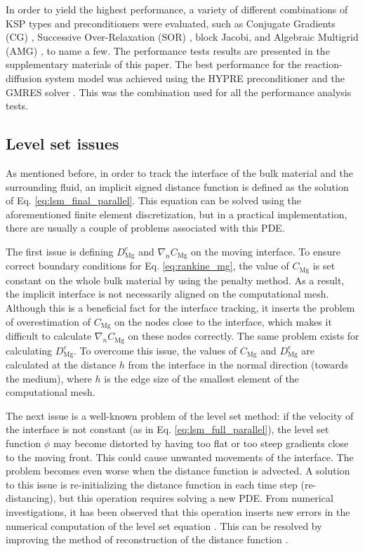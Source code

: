 In order to yield the highest performance, a variety of different combinations of \gls{KSP} types and preconditioners were evaluated, such as Conjugate Gradients (\gls{CG}) \cite{hestenes1952}, Successive Over-Relaxation (\gls{SOR}) \cite{habetler1961}, block Jacobi, and Algebraic Multigrid (\gls{AMG}) \cite{mccormick1987}, to name a few. The performance tests results are presented in the supplementary materials of this paper. The best performance for the reaction-diffusion system model was achieved using the HYPRE preconditioner \cite{Falgout2002} and the \gls{GMRES} solver \cite{Saad1986}. This was the combination used for all the performance analysis tests.


\subsection{Level set issues}  \label{sec:hpc_ls_issues}


As mentioned before, in order to track the interface of the bulk material and the surrounding fluid, an implicit signed distance function is defined as the solution of Eq. \ref{eq:lsm_final_parallel}. This equation can be solved using the aforementioned finite element discretization, but in a practical implementation, there are usually a couple of problems associated with this \gls{PDE}.

The first issue is defining $D_{\mathrm{Mg}}^{e}$ and $\nabla_{n} C_\mathrm{Mg}$ on the moving interface. To ensure correct boundary conditions for Eq. \ref{eq:rankine_mg}, the value of $C_\mathrm{Mg}$ is set constant on the whole bulk material by using the penalty method. As a result, the implicit interface is not necessarily aligned on the computational mesh. Although this is a beneficial fact for the interface tracking, it inserts the problem of overestimation of $C_\mathrm{Mg}$ on the nodes close to the interface, which makes it difficult to calculate $\nabla_{n} C_\mathrm{Mg}$ on these nodes correctly. The same problem exists for calculating $D_{\mathrm{Mg}}^{e}$. To overcome this issue, the values of $C_\mathrm{Mg}$ and $D_{\mathrm{Mg}}^{e}$ are calculated at the distance $h$ from the interface in the normal direction (towards the medium), where $h$ is the edge size of the smallest element of the computational mesh.

The next issue is a well-known problem of the level set method: if the velocity of the interface is not constant (as in Eq. \ref{eq:lsm_full_parallel}), the level set function $\phi$ may become distorted by having too flat or too steep gradients close to the moving front. This could cause unwanted movements of the interface. The problem becomes even worse when the distance function is advected. A solution to this issue is re-initializing the distance function in each time step (re-distancing), but this operation requires solving a new \gls{PDE}. From numerical investigations, it has been observed that this operation inserts new errors in the numerical computation of the level set equation \cite{Russo2000}. This can be resolved by improving the method of reconstruction of the distance function \cite{Russo2000}.

